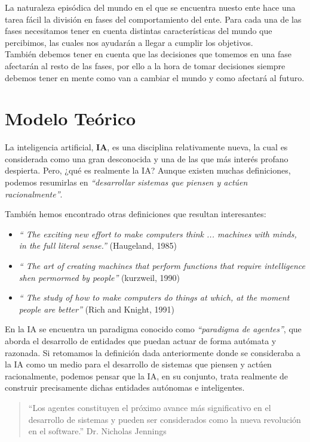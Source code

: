 \documentclass[a4paper,12pt,oneside]{book}
\begin{document}
La naturaleza episódica del mundo en el que se encuentra nuesto ente
hace una tarea fácil la división en fases del comportamiento del
ente. Para cada una de las fases necesitamos tener en cuenta distintas
características del mundo que percibimos, las cuales nos ayudarán a
llegar a cumplir los objetivos. \\

También debemos tener en cuenta que las decisiones que tomemos en una
fase afectarán al resto de las fases, por ello a la hora de tomar
decisiones siempre debemos tener en mente como van a cambiar el mundo
y como afectará al futuro.





\chapter{Modelo Teórico}
La inteligencia artificial, {\bf IA}, es una disciplina relativamente
nueva, la cual es considerada como una gran desconocida y una de las
que más interés profano despierta. Pero, {¿qué es realmente la IA?}
Aunque existen muchas definiciones, podemos resumirlas en {\it
  ``desarrollar sistemas que piensen y actúen racionalmente''}.

También hemos encontrado otras definiciones que resultan interesantes:
\begin{itemize}
\item {\it `` The exciting new effort to make computers think ... machines
    with minds, in the full literal sense.''} (Haugeland, 1985)\\
\item {\it `` The art of creating machines that perform functions that
    require intelligence shen permormed by people''} (kurzweil, 1990)\\
\item {\it `` The study of how to make computers do things at which, at the
    moment people are better''} (Rich and Knight, 1991)
\end{itemize}
En la IA se encuentra un paradigma conocido como {\it ``paradigma de
  agentes''}, que aborda el desarrollo de entidades que puedan actuar
de forma autómata y razonada. Si retomamos la definición dada
anteriormente donde se consideraba a la IA como un medio para el
desarrollo de sistemas que piensen y actúen racionalmente, podemos
pensar que la IA, en su conjunto, trata realmente de construir
precisamente dichas entidades autónomas e inteligentes.
\begin{quote}
  ``Los agentes constituyen el próximo avance más significativo en el
  desarrollo de sistemas y pueden ser considerados como la nueva
  revolución en el software.''
  Dr. Nicholas Jennings
\end{quote}
\end{document}
